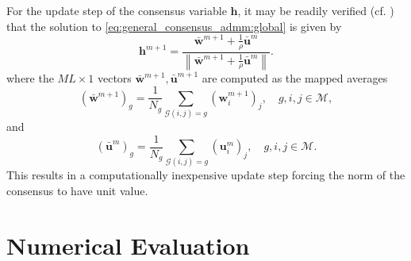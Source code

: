 \documentclass{article}
\newcommand{\hf}{{\bm{h}}}
\newcommand{\wf}{{\bm{w}}}
\newcommand{\uuf}{{\bm{u}}}
\newcommand{\Mset}{\mathcal{M}}
\begin{document}
For the update step of the consensus variable \(\hf\), it may be readily verified (cf. \cite{boydDistributedOptimizationStatistical2011}) that the solution to \eqref{eq:general_consensus_admm:global} is given by
\begin{equation}
    \hf^{m+1} = \frac{\bar{\wf}^{m+1} + \frac{1}{\rho} \bar{\uuf}^{m} }{\left\| \bar{\wf}^{m+1} + \frac{1}{\rho} \bar{\uuf}^{m} \right\|}.\label{eq:online_admm:consensus_update}
\end{equation}
where the \(M L \times 1\) vectors \(\bar{\wf}^{m+1}, \bar{\uuf}^{m+1}\) are computed as the mapped averages
\begin{equation}
    (\bar{\wf}^{m+1})_g = \frac{1}{N_g} \sum_{\mathcal{G}(i,j)=g} (\wf_i^{m+1})_j,\quad g,i,j \in \Mset,
\end{equation}
and
\begin{equation}
    (\bar{\uuf}^{m})_g = \frac{1}{N_g} \sum_{\mathcal{G}(i,j)=g} (\uuf_i^{m})_j,\quad g,i,j \in \Mset.
\end{equation}
This results in a computationally inexpensive update step forcing the norm of the consensus to have unit value.

\section{Numerical Evaluation}
\label{sec:perf_eval}
\end{document}
